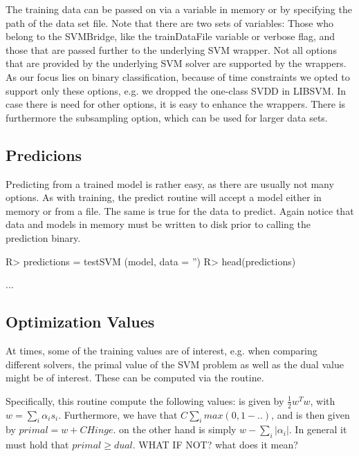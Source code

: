 \documentclass[article, shortnames]{jss}
\begin{document}
The training data can be passed on via a variable in memory or by specifying the path 
of the data set file. 
Note that there are two sets of variables: Those who belong to the SVMBridge,
like the trainDataFile variable or verbose flag, and those that are passed further
to the underlying SVM wrapper.
Not all options that are provided by the underlying SVM solver
are supported by the wrappers. As our focus lies on binary classification, because of time constraints 
we opted  to support only these options, e.g. we dropped the one-class SVDD in LIBSVM.
In case there is need for other options, it is 
easy to enhance the wrappers.
There is furthermore the subsampling option, which can be used for larger data sets.


\subsection{Predicions}

Predicting from a trained model is rather easy, as there are usually not many options.
As with training, the predict routine will accept a model either in memory or from a file.
The same is true for the data to predict.  Again notice that data and models in memory 
must be written to disk prior to calling the prediction binary.

\begin{CodeChunk}
\begin{CodeInput}
R> predictions = testSVM (model, data = '')
R> head(predictions)
\end{CodeInput}
\begin{CodeOutput}
...
\end{CodeOutput}
\end{CodeChunk}


\subsection{Optimization Values}

At times, some of the training values are of interest,
e.g. when comparing different solvers, the primal value
of the SVM problem as well as the dual value might  be of interest.
These can be computed via the  routine.

Specifically, this routine compute the following values:
 is given by $\frac{1}{2} w^T w$, with
$w = \sum_i \alpha_i s_i$. Furthermore, we have
that $C \sum_i max (0, 1 - ..) $, and 
 is then given by $primal = w + CHinge$.
 on the other hand is simply
$w - \sum_i |\alpha_i|$. In general it must hold
that $primal \geq dual$. 
WHAT IF NOT? what does it mean?
\end{document}
